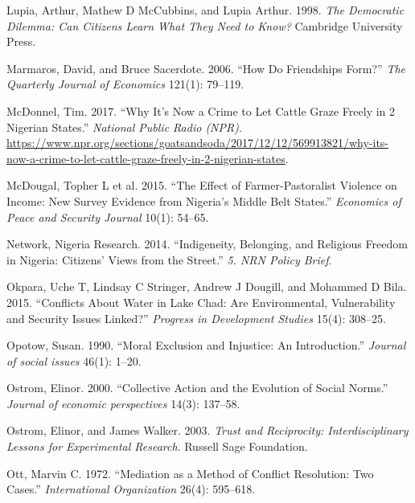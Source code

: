 \documentclass[11pt]{article}
\begin{document}
\leavevmode\hypertarget{ref-lupia1998democratic}{}%
Lupia, Arthur, Mathew D McCubbins, and Lupia Arthur. 1998. \emph{The
Democratic Dilemma: Can Citizens Learn What They Need to Know?}
Cambridge University Press.

\leavevmode\hypertarget{ref-marmaros2006friendships}{}%
Marmaros, David, and Bruce Sacerdote. 2006. ``How Do Friendships Form?''
\emph{The Quarterly Journal of Economics} 121(1): 79--119.

\leavevmode\hypertarget{ref-mcdonnel2017graze}{}%
McDonnel, Tim. 2017. ``Why It's Now a Crime to Let Cattle Graze Freely
in 2 Nigerian States.'' \emph{National Public Radio (NPR)}.
\url{https://www.npr.org/sections/goatsandsoda/2017/12/12/569913821/why-its-now-a-crime-to-let-cattle-graze-freely-in-2-nigerian-states}.

\leavevmode\hypertarget{ref-mcdougal2015effect}{}%
McDougal, Topher L et al. 2015. ``The Effect of Farmer-Pastoralist
Violence on Income: New Survey Evidence from Nigeria's Middle Belt
States.'' \emph{Economics of Peace and Security Journal} 10(1): 54--65.

\leavevmode\hypertarget{ref-nigeria2014freedom}{}%
Network, Nigeria Research. 2014. ``Indigeneity, Belonging, and Religious
Freedom in Nigeria: Citizens' Views from the Street.'' \emph{5. NRN
Policy Brief}.

\leavevmode\hypertarget{ref-okpara2015conflicts}{}%
Okpara, Uche T, Lindsay C Stringer, Andrew J Dougill, and Mohammed D
Bila. 2015. ``Conflicts About Water in Lake Chad: Are Environmental,
Vulnerability and Security Issues Linked?'' \emph{Progress in
Development Studies} 15(4): 308--25.

\leavevmode\hypertarget{ref-opotow1990moral}{}%
Opotow, Susan. 1990. ``Moral Exclusion and Injustice: An Introduction.''
\emph{Journal of social issues} 46(1): 1--20.

\leavevmode\hypertarget{ref-ostrom2000collective}{}%
Ostrom, Elinor. 2000. ``Collective Action and the Evolution of Social
Norms.'' \emph{Journal of economic perspectives} 14(3): 137--58.

\leavevmode\hypertarget{ref-ostrom2003trust}{}%
Ostrom, Elinor, and James Walker. 2003. \emph{Trust and Reciprocity:
Interdisciplinary Lessons for Experimental Research}. Russell Sage
Foundation.

\leavevmode\hypertarget{ref-ott1972mediation}{}%
Ott, Marvin C. 1972. ``Mediation as a Method of Conflict Resolution: Two
Cases.'' \emph{International Organization} 26(4): 595--618.
\end{document}
